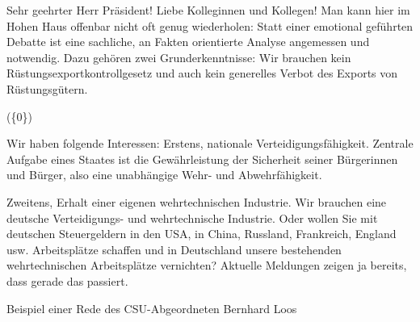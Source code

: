 \begin{example}[H]
    Sehr geehrter Herr Präsident! Liebe Kolleginnen und Kollegen! Man kann hier im Hohen Haus offenbar nicht oft genug wiederholen: Statt einer emotional geführten Debatte ist eine sachliche, an Fakten orientierte Analyse angemessen und notwendig. Dazu gehören zwei Grunderkenntnisse: Wir brauchen kein Rüstungsexportkontrollgesetz und auch kein generelles Verbot des Exports von Rüstungsgütern.

    (\{0\})

    Wir haben folgende Interessen: Erstens, nationale Verteidigungsfähigkeit. Zentrale Aufgabe eines Staates ist die Gewährleistung der Sicherheit seiner Bürgerinnen und Bürger, also eine unabhängige Wehr- und Abwehrfähigkeit.

    Zweitens, Erhalt einer eigenen wehrtechnischen Industrie. Wir brauchen eine deutsche Verteidigungs- und wehrtechnische Industrie. Oder wollen Sie mit deutschen Steuergeldern in den USA, in China, Russland, Frankreich, England usw. Arbeitsplätze schaffen und in Deutschland unsere bestehenden wehrtechnischen Arbeitsplätze vernichten? Aktuelle Meldungen zeigen ja bereits, dass gerade das passiert.
    \caption{Beispiel einer Rede des \acs{CSU}-Abgeordneten Bernhard Loos \autocite{richter_open_2021}} \label{list:exampleSpeechCsu}
\end{example}

